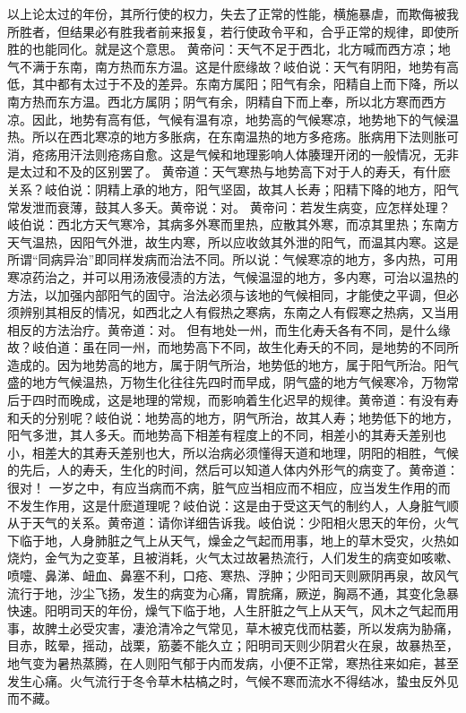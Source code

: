 \documentclass[a4paper,12pt,UTF8,twoside]{ctexbook}
\begin{document}
以上论太过的年份，其所行使的权力，失去了正常的性能，横施暴虐，而欺侮被我所胜者，但结果必有胜我者前来报复，若行使政令平和，合乎正常的规律，即使所胜的也能同化。就是这个意思。
黄帝问：天气不足于西北，北方喊而西方凉；地气不满于东南，南方热而东方温。这是什麽缘故？岐伯说：天气有阴阳，地势有高低，其中都有太过于不及的差异。东南方属阳；阳气有余，阳精自上而下降，所以南方热而东方温。西北方属阴；阴气有余，阴精自下而上奉，所以北方寒而西方凉。因此，地势有高有低，气候有温有凉，地势高的气候寒凉，地势地下的气候温热。所以在西北寒凉的地方多胀病，在东南温热的地方多疮疡。胀病用下法则胀可消，疮疡用汗法则疮疡自愈。这是气候和地理影响人体腠理开闭的一般情况，无非是太过和不及的区别罢了。
黄帝道：天气寒热与地势高下对于人的寿夭，有什麽关系？岐伯说：阴精上承的地方，阳气坚固，故其人长寿；阳精下降的地方，阳气常发泄而衰薄，鼓其人多夭。黄帝说：对。
黄帝问：若发生病变，应怎样处理？岐伯说：西北方天气寒冷，其病多外寒而里热，应散其外寒，而凉其里热；东南方天气温热，因阳气外泄，故生内寒，所以应收敛其外泄的阳气，而温其内寒。这是所谓“同病异治”即同样发病而治法不同。所以说：气候寒凉的地方，多内热，可用寒凉药治之，并可以用汤液侵渍的方法，气候温湿的地方，多内寒，可治以温热的方法，以加强内部阳气的固守。治法必须与该地的气候相同，才能使之平调，但必须辨别其相反的情况，如西北之人有假热之寒病，东南之人有假寒之热病，又当用相反的方法治疗。黄帝道：对。
但有地处一州，而生化寿夭各有不同，是什么缘故？岐伯道：虽在同一州，而地势高下不同，故生化寿夭的不同，是地势的不同所造成的。因为地势高的地方，属于阴气所治，地势低的地方，属于阳气所治。阳气盛的地方气候温热，万物生化往往先四时而早成，阴气盛的地方气候寒冷，万物常后于四时而晚成，这是地理的常规，而影响着生化迟早的规律。黄帝道：有没有寿和夭的分别呢？岐伯说：地势高的地方，阴气所治，故其人寿；地势低下的地方，阳气多泄，其人多夭。而地势高下相差有程度上的不同，相差小的其寿夭差别也小，相差大的其寿夭差别也大，所以治病必须懂得天道和地理，阴阳的相胜，气候的先后，人的寿夭，生化的时间，然后可以知道人体内外形气的病变了。黄帝道：很对！
一岁之中，有应当病而不病，脏气应当相应而不相应，应当发生作用的而不发生作用，这是什麽道理呢？岐伯说：这是由于受这天气的制约人，人身脏气顺从于天气的关系。黄帝道：请你详细告诉我。岐伯说：少阳相火思天的年份，火气下临于地，人身肺脏之气上从天气，燥金之气起而用事，地上的草木受灾，火热如烧灼，金气为之变革，且被消耗，火气太过故暑热流行，人们发生的病变如咳嗽、喷嚏、鼻涕、衄血、鼻塞不利，口疮、寒热、浮肿；少阳司天则厥阴再泉，故风气流行于地，沙尘飞扬，发生的病变为心痛，胃脘痛，厥逆，胸鬲不通，其变化急暴快速。阳明司天的年份，燥气下临于地，人生肝脏之气上从天气，风木之气起而用事，故脾土必受灾害，凄沧清冷之气常见，草木被克伐而枯萎，所以发病为胁痛，目赤，眩晕，摇动，战栗，筋萎不能久立；阳明司天则少阴君火在泉，故暴热至，地气变为暑热蒸腾，在人则阳气郁于内而发病，小便不正常，寒热往来如疟，甚至发生心痛。火气流行于冬令草木枯槁之时，气候不寒而流水不得结冰，蛰虫反外见而不藏。
\end{document}
